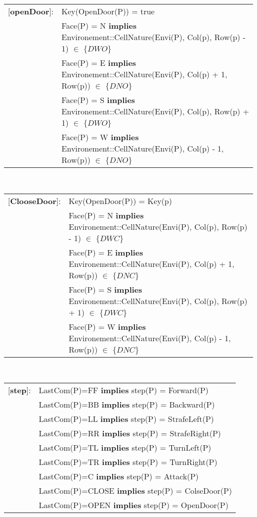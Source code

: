 \documentclass[11pt]{article}
\begin{document}
\begin{tabular}{rl} 
[\textbf{openDoor}]: & Key(OpenDoor(P)) = true\\
&
Face(P) = N \textbf{implies} Environement::CellNature(Envi(P), Col(p), Row(p) - 1) $\in$ $\{ DWO\}$ \\
&
Face(P) = E \textbf{implies} Environement::CellNature(Envi(P), Col(p) + 1, Row(p)) $\in$ $\{ DNO\}$ \\
&
Face(P) = S \textbf{implies} Environement::CellNature(Envi(P), Col(p), Row(p) + 1) $\in$ $\{ DWO\}$ \\
&

Face(P) = W \textbf{implies} Environement::CellNature(Envi(P), Col(p) - 1, Row(p)) $\in$ $\{ DNO\}$
\end{tabular}\\
[0.5cm]
\begin{tabular}{rl}
[\textbf{ClooseDoor}]: & Key(OpenDoor(P)) = Key(p) \\
&
Face(P) = N \textbf{implies} Environement::CellNature(Envi(P), Col(p), Row(p) - 1) $\in$ $\{ DWC\}$ \\
&
Face(P) = E \textbf{implies} Environement::CellNature(Envi(P), Col(p) + 1, Row(p)) $\in$ $\{ DNC\}$ \\
&
Face(P) = S \textbf{implies} Environement::CellNature(Envi(P), Col(p), Row(p) + 1) $\in$ $\{ DWC\}$ \\
&
Face(P) = W \textbf{implies} Environement::CellNature(Envi(P), Col(p) - 1, Row(p)) $\in$ $\{ DNC\}$
\end{tabular}\\
[0.5cm]
\begin{tabular}{rl}
[\textbf{step}]: &
\quad LastCom(P)=FF \textbf{implies} step(P) = Forward(P) \\
& 
\quad LastCom(P)=BB \textbf{implies} step(P) = Backward(P)\\
&
\quad LastCom(P)=LL \textbf{implies} step(P) = StrafeLeft(P)\\
&
\quad LastCom(P)=RR \textbf{implies} step(P) = StrafeRight(P)\\
&
\quad LastCom(P)=TL \textbf{implies} step(P) = TurnLeft(P)\\
&
\quad LastCom(P)=TR \textbf{implies} step(P) = TurnRight(P)\\
&
\quad LastCom(P)=C \textbf{implies} step(P) = Attack(P) \\
&
\quad LastCom(P)=CLOSE \textbf{implies} step(P) = ColseDoor(P)\\
&
\quad LastCom(P)=OPEN \textbf{implies} step(P) = OpenDoor(P)
\end{tabular}
\end{document}
